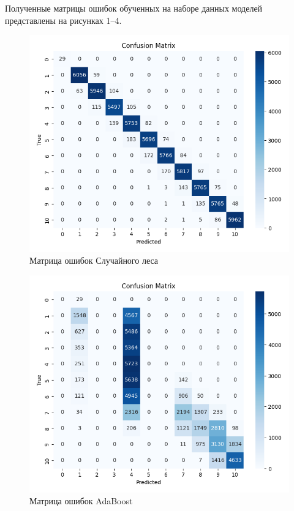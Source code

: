 \newpage
\noindent {}
\label{sec:matrix}

Полученные матрицы ошибок обученных на наборе данных моделей представлены на рисунках 1–4.

\begin{figure}[H]
    \centering
    \includegraphics[width=0.72\linewidth]{pic/classification/random_forest.png}
    \vspace{0.5em}\caption{Матрица ошибок Случайного леса}
    \label{ris:forest-class}
\end{figure}
\vspace{1em}

\begin{figure}[H]
    \centering
    \includegraphics[width=0.72\linewidth]{pic/classification/adaboost.png}
    \vspace{0.5em}\caption{Матрица ошибок AdaBoost}
    \label{ris:adaboost-class}
\end{figure}

